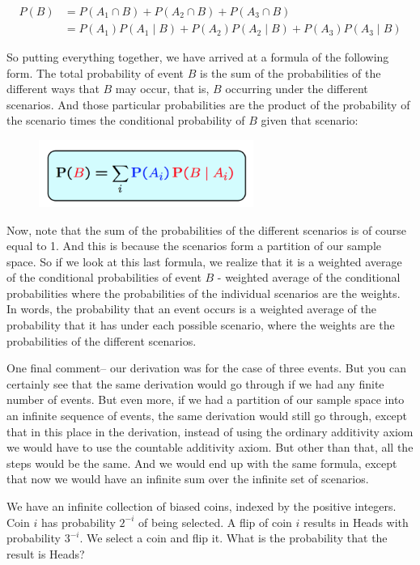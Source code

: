 \documentclass{tufte-handout}
\begin{document}
\begin{align*}
P(B) &= P(A_1 \cap B) + P(A_2 \cap B) + P(A_3 \cap B)\\
       &= P(A_1) P(A_1 \mid B) + P(A_2) P(A_2 \mid B) + P(A_3) P(A_3 \mid B)
\end{align*}


So putting everything together, we have arrived at a formula of the following form. The total probability of event $B$
is the sum of the probabilities of the different ways that $B$ may occur, that is, $B$ occurring under the
different scenarios. And those particular probabilities are the product of the probability of the scenario
times the conditional probability of $B$ given that scenario:

\begin{figure}
  \includegraphics[width=7cm]{TotProbLaw}
\end{figure}


Now, note that the sum of the probabilities of the different scenarios is of course equal to 1. And this is
because the scenarios form a partition of our sample space. So if we look at this last formula, we
realize that it is a weighted average of the conditional probabilities of event $B$ - weighted average of the
conditional probabilities where the probabilities of the individual scenarios are the weights. In words,
the probability that an event occurs is a weighted average of the probability that it has under each
possible scenario, where the weights are the probabilities of the different scenarios.

One final comment-- our derivation was for the case of three events. But you can certainly see that the
same derivation would go through if we had any finite number of events. But even more, if we had a
partition of our sample space into an infinite sequence of events, the same derivation would still go
through, except that in this place in the derivation, instead of using the ordinary additivity axiom we
would have to use the countable additivity axiom. But other than that, all the steps would be the same.
And we would end up with the same formula, except that now we would have an infinite sum over the
infinite set of scenarios.


 We have an infinite collection of biased coins, indexed 
by the positive integers. Coin $i$ has probability $2^{-i}$ of being selected. A flip of coin $i$ results in
Heads with probability $3^{-i}$. We select a coin and flip it. What is the probability that the result is Heads? 
\end{document}
